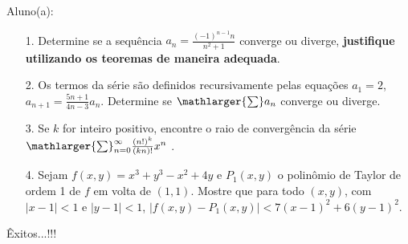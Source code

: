 \documentclass[oneside,a4paper,12pt]{article}
\begin{document}
     \begin{flushleft}
     	Aluno(a):
     \end{flushleft}
 
 \begin{itemize}
 	\item[1.] Determine se a sequência  $a_{n}=\frac{(-1)^{n-1}n}{n^{2}+1}$ converge ou diverge, \textbf{justifique utilizando os teoremas de maneira adequada}.
 \end{itemize}
 \begin{itemize}
 	\item[2.] Os termos da série são definidos recursivamente pelas equações
 	$a_{1}=2$, $a_{n+1}=\frac{5n+1}{4n-3}a_{n}$. Determine se $\mathlarger{\sum} a_{n}$ converge ou diverge. 
 \end{itemize}
 \begin{itemize}
 	\item [3.] Se $k$ for inteiro positivo, encontre o raio de convergência da série $\mathlarger{\sum}_{n=0}^{\infty}\frac{(n!)^{k}}{(kn)!}x^{n}$ .
 \end{itemize}
 \begin{itemize}
 	\item[4.] Sejam $f(x,y)=x^{3}+y^{3}-x^{2}+4y$ e $P_{1}(x,y)$ o polinômio de Taylor de ordem 1 de $f$ em volta de $(1,1)$. Mostre que para todo $(x,y)$, com $|x-1|<1$ e $|y-1|<1$, $\left|f(x,y)-P_{1}(x,y)\right|<7(x-1)^{2}+6(y-1)^{2}$.
 \end{itemize}
 
\flushbottom
\flushright
Êxitos...!!!
\end{document}
